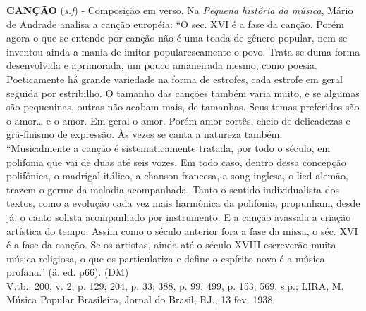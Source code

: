\textbf{CANÇÃO} (\emph{s.f}) - Composição em verso. Na \emph{Pequena
história da música}, Mário de Andrade analisa a canção européia: ``O
sec. XVI é a fase da canção. Porém agora o que se entende por canção não
é uma toada de gênero popular, nem se inventou ainda a mania de imitar
popularescamente o povo. Trata-se duma forma desenvolvida e aprimorada,
um pouco amaneirada mesmo, como poesia. Poeticamente há grande variedade
na forma de estrofes, cada estrofe em geral seguida por estribilho. O
tamanho das canções também varia muito, e se algumas são pequeninas,
outras não acabam mais, de tamanhas. Seus temas preferidos são o
amor\ldots{} e o amor. Em geral o amor. Porém amor cortês, cheio de
delicadezas e grã-finismo de expressão. Às vezes se canta a natureza
também.\\
``Musicalmente a canção é sistematicamente tratada, por todo o século,
em polifonia que vai de duas até seis vozes. Em todo caso, dentro dessa
concepção polifônica, o madrigal itálico, a chanson francesa, a song
inglesa, o lied alemão, trazem o germe da melodia acompanhada. Tanto o
sentido individualista dos textos, como a evolução cada vez mais
harmônica da polifonia, propunham, desde já, o canto solista acompanhado
por instrumento. E a canção avassala a criação artística do tempo. Assim
como o século anterior fora a fase da missa, o séc. XVI é a fase da
canção. Se os artistas, ainda até o século XVIII escreverão muita música
religiosa, o que os particulariza e define o espírito novo é a música
profana.'' (ä. ed. p66). (DM)\\
V.tb.: 200, v. 2, p. 129; 204, p. 33; 388, p. 99; 499, p. 153; 569,
s.p.; LIRA, M. Música Popular Brasileira, Jornal do Brasil, RJ., 13 fev.
1938.

